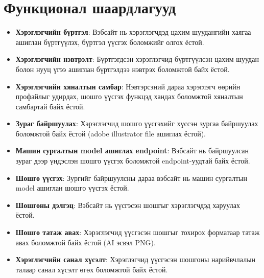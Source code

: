 \section{Функционал шаардлагууд}
\begin{itemize}
	\item \textbf{Хэрэглэгчийн бүртгэл}: Вэбсайт нь хэрэглэгчдэд цахим шуудангийн хаягаа ашиглан бүртгүүлэх, бүртгэл үүсгэх боломжийг олгох ёстой.

	\item \textbf{Хэрэглэгчийн нэвтрэлт}: Бүртгэгдсэн хэрэглэгчид бүртгүүлсэн цахим шуудан болон нууц үгээ ашиглан бүртгэлдээ нэвтрэх боломжтой байх ёстой.

	\item \textbf{Хэрэглэгчийн хяналтын самбар}: Нэвтэрсэний дараа хэрэглэгч өөрийн профайлыг удирдах, шошго үүсгэх функцэд хандах боломжтой хяналтын самбартай байх ёстой.

	\item \textbf{Зураг байршуулах}: Хэрэглэгчид шошго үүсгэхийг хүссэн зургаа байршуулах боломжтой байх ёстой (adobe illustrator file ашиглах ёстой).

	\item \textbf{Машин сургалтын model ашиглах endpoint}: Вэбсайт нь байршуулсан зураг дээр үндэслэн шошго үүсгэх боломжтой endpoint-уудтай байх ёстой.

	\item \textbf{Шошго үүсгэх}: Зургийг байршуулсны дараа вэбсайт нь машин сургалтын model ашиглан шошго үүсгэх ёстой.

	\item \textbf{Шошгоны дэлгэц}: Вэбсайт нь үүсгэсэн шошгыг хэрэглэгчдэд харуулах ёстой.

	\item \textbf{Шошго татаж авах}: Хэрэглэгчид үүсгэсэн шошгыг тохирох форматаар татаж авах боломжтой байх ёстой (AI эсвэл PNG).

	\item \textbf{Хэрэглэгчийн санал хүсэлт}: Хэрэглэгчид үүсгэсэн шошгоны нарийвчлалын талаар санал хүсэлт өгөх боломжтой байх ёстой.
\end{itemize}
